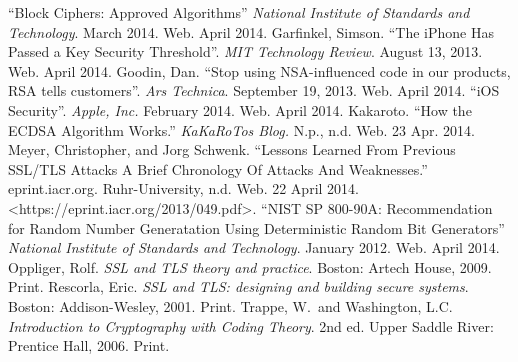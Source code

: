 \begin{thebibliography}{1}
 ``Block Ciphers: Approved Algorithms'' \textit{National Institute of Standards and Technology}. March 2014. Web. April 2014.
 Garfinkel, Simson. ``The iPhone Has Passed a Key Security Threshold''. \textit{MIT Technology Review}. August 13, 2013. Web. April 2014.
 Goodin, Dan. ``Stop using NSA-influenced code in our products, RSA tells customers''. \textit{Ars Technica}. September 19, 2013. Web. April 2014.
 ``iOS Security''. \textit{Apple, Inc.} February 2014. Web. April 2014.
 Kakaroto. ``How the ECDSA Algorithm Works.'' \textit{KaKaRoTos Blog.} N.p., n.d. Web. 23 Apr. 2014.
 Meyer, Christopher, and Jorg Schwenk. ``Lessons Learned From Previous SSL/TLS Attacks A Brief Chronology Of Attacks And Weaknesses.'' eprint.iacr.org. Ruhr-University, n.d. Web. 22 April 2014. <https://eprint.iacr.org/2013/049.pdf>.
 ``NIST SP 800-90A: Recommendation for Random Number Generatation Using Deterministic Random Bit Generators'' \textit{National Institute of Standards and Technology}. January 2012. Web. April 2014.
 Oppliger, Rolf. \textit{SSL and TLS theory and practice}. Boston: Artech House, 2009. Print.
 Rescorla, Eric. \textit{SSL and TLS: designing and building secure systems}. Boston: Addison-Wesley, 2001. Print.
 Trappe, W.\ and Washington, L.C. \textit{Introduction to Cryptography with Coding Theory}. 2nd ed. Upper Saddle River: Prentice Hall, 2006. Print.
\end{thebibliography}
